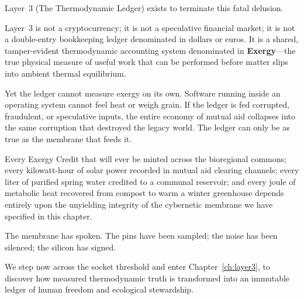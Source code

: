 Layer~3 (The Thermodynamic Ledger) exists to terminate this fatal delusion.

Layer~3 is not a cryptocurrency; it is not a speculative financial market; it is not a double-entry bookkeeping ledger denominated in dollars or euros. It is a shared, tamper-evident thermodynamic accounting system denominated in \textbf{Exergy}---the true physical measure of useful work that can be performed before matter slips into ambient thermal equilibrium.

Yet the ledger cannot measure exergy on its own. Software running inside an operating system cannot feel heat or weigh grain. If the ledger is fed corrupted, fraudulent, or speculative inputs, the entire economy of mutual aid collapses into the same corruption that destroyed the legacy world. The ledger can only be as true as the membrane that feeds it.

Every Exergy Credit that will ever be minted across the bioregional commons; every kilowatt-hour of solar power recorded in mutual aid clearing channels; every liter of purified spring water credited to a communal reservoir; and every joule of metabolic heat recovered from compost to warm a winter greenhouse depends entirely upon the unyielding integrity of the cybernetic membrane we have specified in this chapter.

The membrane has spoken. The pins have been sampled; the noise has been silenced; the silicon has signed. 

We step now across the socket threshold and enter Chapter~\ref{ch:layer3}, to discover how measured thermodynamic truth is transformed into an immutable ledger of human freedom and ecological stewardship.
